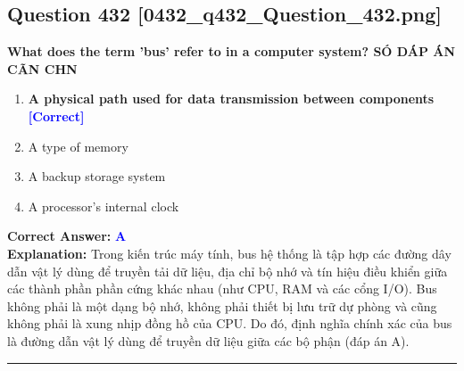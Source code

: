 \documentclass[11pt,a4paper]{article}
\begin{document}
\begin{minipage}{\textwidth}
\subsection*{Question 432 \quad \footnotesize{[0432\_q432\_Question\_432.png]}}
\noindent \textbf{What does the term 'bus' refer to in a computer system? SÓ DÁP ÁN CÃN CHN}

\begin{enumerate}[label=\Alph*.]
    \item \textbf{A physical path used for data transmission between components} \hfill \textcolor{blue}{\textbf{[Correct]}}
    \item A type of memory
    \item A backup storage system
    \item A processor's internal clock
\end{enumerate}

\noindent \textbf{Correct Answer:} \textcolor{blue}{\textbf{A}} \\[2pt]
\noindent \textbf{Explanation:} Trong kiến trúc máy tính, bus hệ thống là tập hợp các đường dây dẫn vật lý dùng để truyền tải dữ liệu, địa chỉ bộ nhớ và tín hiệu điều khiển giữa các thành phần phần cứng khác nhau (như CPU, RAM và các cổng I/O). Bus không phải là một dạng bộ nhớ, không phải thiết bị lưu trữ dự phòng và cũng không phải là xung nhịp đồng hồ của CPU. Do đó, định nghĩa chính xác của bus là đường dẫn vật lý dùng để truyền dữ liệu giữa các bộ phận (đáp án A).

\par\vspace{0.3cm}
\hrule
\vspace{0.3cm}
\end{minipage}
\end{document}
